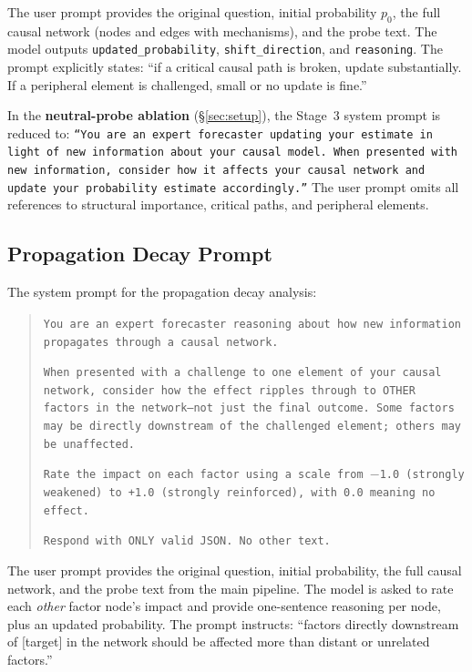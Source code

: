 \documentclass[11pt]{article}
\begin{document}
The user prompt provides the original question, initial probability $p_0$, the full causal network (nodes and edges with mechanisms), and the probe text. The model outputs \texttt{updated\_probability}, \texttt{shift\_direction}, and \texttt{reasoning}. The prompt explicitly states: ``if a critical causal path is broken, update substantially. If a peripheral element is challenged, small or no update is fine.''

In the \textbf{neutral-probe ablation} (\S\ref{sec:setup}), the Stage~3 system prompt is reduced to: \texttt{``You are an expert forecaster updating your estimate in light of new information about your causal model. When presented with new information, consider how it affects your causal network and update your probability estimate accordingly.''} The user prompt omits all references to structural importance, critical paths, and peripheral elements.

\subsection{Propagation Decay Prompt}
\label{app:prompt-propagation}

The system prompt for the propagation decay analysis:

\begin{quote}
\small
\texttt{You are an expert forecaster reasoning about how new information propagates through a causal network.}

\texttt{When presented with a challenge to one element of your causal network, consider how the effect ripples through to OTHER factors in the network---not just the final outcome. Some factors may be directly downstream of the challenged element; others may be unaffected.}

\texttt{Rate the impact on each factor using a scale from $-$1.0 (strongly weakened) to +1.0 (strongly reinforced), with 0.0 meaning no effect.}

\texttt{Respond with ONLY valid JSON. No other text.}
\end{quote}

The user prompt provides the original question, initial probability, the full causal network, and the probe text from the main pipeline. The model is asked to rate each \emph{other} factor node's impact and provide one-sentence reasoning per node, plus an updated probability. The prompt instructs: ``factors directly downstream of [target] in the network should be affected more than distant or unrelated factors.''
\end{document}
